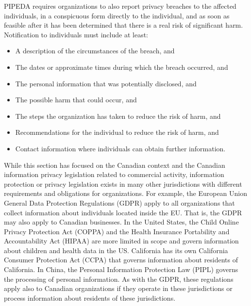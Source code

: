 PIPEDA requires organizations to also report privacy breaches to the affected individuals, in a conspicuous form directly to the individual, and as soon as feasible after it has been determined that there is a real risk of significant harm. Notification to individuals must include at least:
\begin{itemize}
\item A description of the circumstances of the breach, and
\item The dates or approximate times during which the breach occurred, and
\item The personal information that was potentially disclosed, and
\item The possible harm that could occur, and
\item The steps the organization has taken to reduce the risk of harm, and
\item Recommendations for the individual to reduce the risk of harm, and
\item Contact information where individuals can obtain further information.
\end{itemize}

While this section has focused on the Canadian context and the Canadian information privacy legislation related to commercial activity, information protection or privacy legislation exists in many other jurisdictions with different requirements and obligations for organizations. For example, the European Union General Data Protection Regulations (GDPR) apply to all organizations that collect information about individuals located inside the EU. That is, the GDPR may also apply to Canadian businesses. In the United States, the Child Online Privacy Protection Act (COPPA) and the Health Insurance Portability and Accountability Act (HIPAA) are more limited in scope and govern information about children and health data in the US. California has its own California Consumer Protection Act (CCPA) that governs information about residents of California. In China, the Personal Information Protection Law (PIPL) governs the processing of personal information. As with the GDPR, these regulations apply also to Canadian organizations if they operate in these jurisdictions or process information about residents of these jurisdictions.

